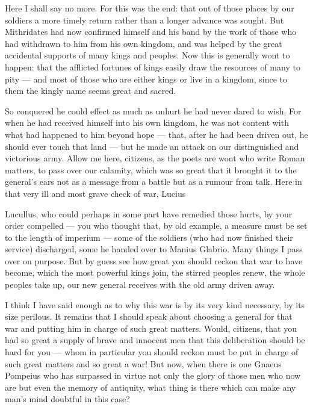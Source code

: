  Here I shall say no more. For this was the end: that out of those places by our soldiers a more timely return rather than a longer advance was sought. But Mithridates had now confirmed himself and his band by the work of those who had withdrawn to him from his own kingdom, and was helped by the great accidental supports of many kings and peoples. Now this is generally wont to happen: that the afflicted fortunes of kings easily draw the resources of many to pity --- and most of those who are either kings or live in a kingdom, since to them the kingly name seems great and sacred.

 So conquered he could effect as much as unhurt he had never dared to wish. For when he had received himself into his own kingdom, he was not content with what had happened to him beyond hope --- that, after he had been driven out, he should ever touch that land --- but he made an attack on our distinguished and victorious army. Allow me here, citizens, as the poets are wont who write Roman matters, to pass over our calamity, which was so great that it brought it to the general's ears not as a message from a battle but as a rumour from talk. Here in that very ill and most grave check of war, Lucius

 Lucullus, who could perhaps in some part have remedied those hurts, by your order compelled --- you who thought that, by old example, a measure must be set to the length of imperium --- some of the soldiers (who had now finished their service) discharged, some he handed over to Manius Glabrio. Many things I pass over on purpose. But by guess see how great you should reckon that war to have become, which the most powerful kings join, the stirred peoples renew, the whole peoples take up, our new general receives with the old army driven away.

 I think I have said enough as to why this war is by its very kind necessary, by its size perilous. It remains that I should speak about choosing a general for that war and putting him in charge of such great matters. Would, citizens, that you had so great a supply of brave and innocent men that this deliberation should be hard for you --- whom in particular you should reckon must be put in charge of such great matters and so great a war! But now, when there is one Gnaeus Pompeius who has surpassed in virtue not only the glory of those men who now are but even the memory of antiquity, what thing is there which can make any man's mind doubtful in this case?

